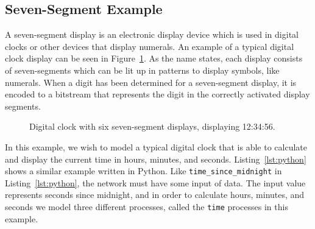 \subsection{Seven-Segment Example}
\label{sec:example-seven_segment_intro}
A seven-segment display is an electronic display device which is used in digital clocks or other devices that display numerals. An example of a typical digital clock display can be seen in Figure~\ref{fig:6_displays}. As the name states, each display consists of seven-segments which can be lit up in patterns to display symbols, like numerals.
When a digit has been determined for a seven-segment display, it is encoded to a bitstream that represents the digit in the correctly activated display segments.
\begin{figure}[!ht]
  \begin{center}
  \end{center}
  \caption{Digital clock with six seven-segment displays, displaying 12:34:56.}
  \label{fig:6_displays}
\end{figure}
In this example, we wish to model a typical digital clock that is able to calculate and display the current time in hours, minutes, and seconds. Listing~\ref{lst:python} shows a similar example written in Python. Like \texttt{time\_since\_midnight} in Listing~\ref{lst:python}, the network must have some input of data. The input value represents seconds since midnight, and in order to calculate hours, minutes, and seconds we model three different processes, called the \texttt{time} processes in this example.\\

